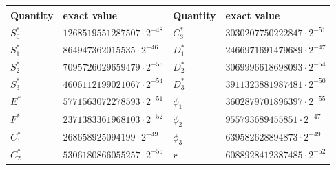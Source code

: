 \begin{tabular}{ll@{\qquad}ll}
\toprule
Quantity & exact value & Quantity & exact value\\
\midrule
$S_0^*$ & $1268519551287507\cdot2^{-48}$ & $C_3^*$ & $3030207750222847\cdot2^{-51}$\\
$S_1^*$ & $864947362015535\cdot2^{-46}$ & $D_1^*$ & $2466971691479689\cdot2^{-47}$\\
$S_2^*$ & $7095726029659479\cdot2^{-55}$ & $D_2^*$ & $3069996618698093\cdot2^{-54}$\\
$S_3^*$ & $4606112199021067\cdot2^{-54}$ & $D_3^*$ & $3911323881987481\cdot2^{-50}$\\
$E^*$ & $5771563072278593\cdot2^{-51}$ & $\phi_1$ & $3602879701896397\cdot2^{-55}$\\
$F^*$ & $2371383361968103\cdot2^{-52}$ & $\phi_2$ & $955793689455851\cdot2^{-47}$\\
$C_1^*$ & $268658925094199\cdot2^{-49}$ & $\phi_3$ & $639582628894873\cdot2^{-49}$\\
$C_2^*$ & $5306180866055257\cdot2^{-55}$ & $r$ & $6088928412387485\cdot2^{-52}$\\
\bottomrule
\end{tabular}

